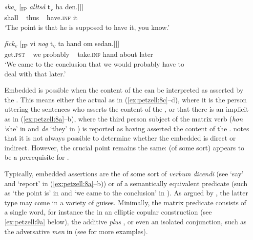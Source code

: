 \documentclass[output=paper,colorlinks,citecolor=brown,draft,draftmode]{langscibook}
\begin{document}
\gll     \textit{{ska}}\textsubscript{v}      [\textsubscript{IP} \textit{{alltså}}  t\textsubscript{v}    ha        den.]]]  \\
    shall     ~     thus   ~    have.\textsc{inf}    it\\
\glt `The point is that he is supposed to have it, you know.’  \\

\ex{\label{ex:petzell:8d}
\gll Vi    drog      slutsatsen [\textsubscript{CP}    att [\textsubscript{CP}     den\\
    we    draw.\textsc{pst}  conclusion.\textsc{def} ~ that    ~   it   \\}

\gll     \textit{{fick}}\textsubscript{v} [\textsubscript{IP}  vi    \textit{{nog}} t\textsubscript{v}     ta      hand  om    sedan.]]]  \\
    get.\textsc{pst} ~ we    probably ~ take.\textsc{inf}  hand   about    later\\
\glt `We came to the conclusion that we would probably have to   \\
    deal with that later.’
\z
\z


Embedded  is possible when the content of the  can be interpreted as asserted by the  \citep[21]{Andersson1975}. This means either the actual  as in (\ref{ex:petzell:8c}–d), where it is the person uttering the sentences who asserts the content of the , or that there is an implicit  as in (\ref{ex:petzell:8a}–b), where the third person subject of the matrix verb (\textit{hon} ‘she’ in  and \textit{de} ‘they’ in ) is reported as having asserted the content of the . \citet[164–167]{Julien2015} notes that it is not always possible to determine whether the embedded  is direct or indirect. However, the crucial point remains the same:   (of some sort) appears to be a prerequisite for .\largerpage



Typically, embedded assertions are the  of some sort of \textit{verbum dicendi} (see ‘say’ and ‘report’ in (\ref{ex:petzell:8a}–b)) or of a semantically equivalent predicate (such as ‘the point is’ in  and ‘we came to the conclusion’ in ). As argued by \citet{Julien2009}, the latter type may come in a variety of guises. Minimally, the matrix predicate consists of a single word, for instance the   in an elliptic copular construction (see \ref{ex:petzell:9a} below), the additive  \textit{plus} , or even an isolated conjunction, such as the adversative \textit{men} in  (see \citealt{Lyngfelt2003} for more examples).
\end{document}
